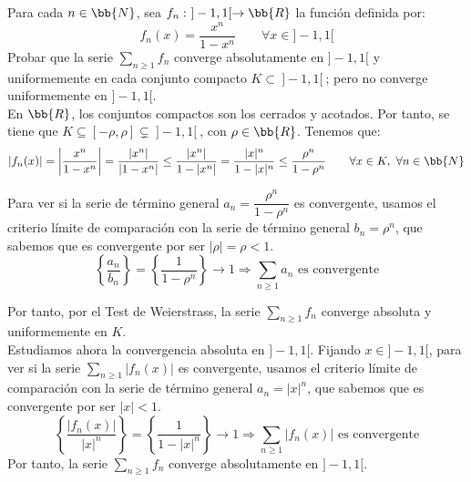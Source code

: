 \begin{ejercicio}
    Para cada $n\in \bb{N}$, sea $f_n:~]-1,1[ \to \bb{R}$ la función definida por:
    \begin{equation*}
        f_n(x) = \frac{x^n}{1-x^n} \qquad \forall x\in]-1,1[
    \end{equation*}
    Probar que la serie $\sum\limits_{n\geq 1}f_n$ converge absolutamente en $]-1,1[$ y uniformemente
    en cada conjunto compacto $K\subset~]-1,1[~$; pero no converge uniformemente en $]-1,1[$.\\
    
    En $\bb{R}$, los conjuntos compactos son los cerrados y acotados. Por tanto, se tiene que $K\subseteq [-\rho, \rho]\subsetneq ~]-1,1[~$, con $\rho\in \bb{R}$. Tenemos que:
    \begin{equation*}
        |f_n(x)| = \left|\frac{x^n}{1-x^n}\right| = \frac{|x^n|}{|1-x^n|} \leq \frac{|x^n|}{1-|x^n|}
        = \frac{|x|^n}{1-|x|^n} \leq \frac{\rho^n}{1-\rho^n} \qquad \forall x\in K,~\forall n\in \bb{N}
    \end{equation*}

    Para ver si la serie de término general $a_n = \dfrac{\rho^n}{1-\rho^n}$ es convergente,
    usamos el criterio límite de comparación con la serie de término general $b_n = \rho^n$, que sabemos que es convergente por ser $|\rho|=\rho < 1$.
    \begin{equation*}
        \left\{\frac{a_n}{b_n}\right\}
        = \left\{\frac{1}{1-\rho^n}\right\} \to 1 \Longrightarrow \sum_{n\geq 1}a_n \text{ es convergente}
    \end{equation*}

    Por tanto, por el Test de Weierstrass, la serie $\sum\limits_{n\geq 1}f_n$ converge absoluta y uniformemente en $K$.\\

    Estudiamos ahora la convergencia absoluta en $]-1,1[$. Fijando $x\in ]-1,1[$, para ver si
    la serie $\sum\limits_{n\geq 1}|f_n(x)|$ es convergente, usamos el criterio límite de comparación
    con la serie de término general $a_n = |x|^n$, que sabemos que es convergente por ser $|x|<1$.
    \begin{equation*}
        \left\{\frac{|f_n(x)|}{|x|^n}\right\} = \left\{\frac{1}{1-|x|^n}\right\}\to 1 \Longrightarrow \sum_{n\geq 1}|f_n(x)| \text{ es convergente}
    \end{equation*}
    Por tanto, la serie $\sum\limits_{n\geq 1}f_n$ converge absolutamente en $]-1,1[$.\\


\end{ejercicio}

